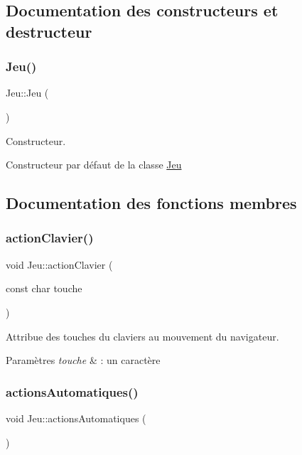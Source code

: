 \subsection{Documentation des constructeurs et destructeur}
\mbox{\label{class_jeu_acc5795ee00edf75516d3dfe65be3e6d6}} 
\subsubsection{\texorpdfstring{Jeu()}{Jeu()}}
{\footnotesize\ttfamily Jeu\+::\+Jeu (\begin{DoxyParamCaption}{ }\end{DoxyParamCaption})}



Constructeur. 

Constructeur par défaut de la classe \hyperlink{class_jeu}{Jeu} 

\subsection{Documentation des fonctions membres}
\mbox{\label{class_jeu_ab27fb1db9e2ae2a0c19a90ecc838319f}} 
\subsubsection{\texorpdfstring{action\+Clavier()}{actionClavier()}}
{\footnotesize\ttfamily void Jeu\+::action\+Clavier (\begin{DoxyParamCaption}\item[{const char}]{touche }\end{DoxyParamCaption})}



Attribue des touches du claviers au mouvement du navigateur. 


\begin{DoxyParams}{Paramètres}
{\em touche} & \+: un caractère \\
\hline
\end{DoxyParams}
\mbox{\label{class_jeu_a849e140df1504ddfd1e1eccc4374718f}} 
\subsubsection{\texorpdfstring{actions\+Automatiques()}{actionsAutomatiques()}}
{\footnotesize\ttfamily void Jeu\+::actions\+Automatiques (\begin{DoxyParamCaption}{ }\end{DoxyParamCaption})}



